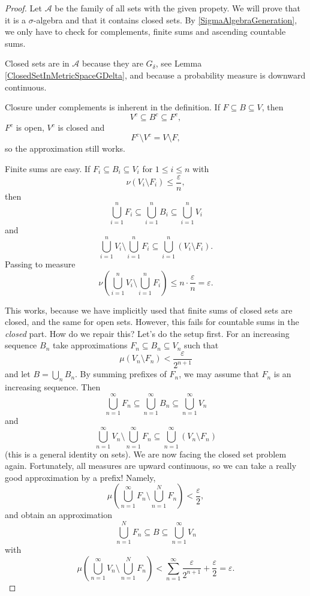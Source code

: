 \begin{proof}
    Let \( \mathcal{A} \) be the family of all sets with the given propety. We will prove that it is a \( \sigma \)-algebra and that it contains closed sets. By \ref{SigmaAlgebraGeneration}, we only have to check for complements, finite sums and ascending countable sums.

    Closed sets are in \( \mathcal{A} \) because they are \( G_\delta \), see Lemma \ref{ClosedSetInMetricSpaceGDelta}, and because a probability measure is downward continuous.

    Closure under complements is inherent in the definition. If \( F \subseteq B \subseteq V \), then 
    \[ 
      V^c \subseteq B^c \subseteq F^c,
   \]
   \( F^c \) is open, \( V^c \) is closed and
   \[ 
      F^c \setminus V^c = V \setminus F, 
  \]
  so the approximation still works.

Finite sums are easy. If \( F_i \subseteq B_i \subseteq V_i \) for \( 1 \leqslant i \leqslant n \) with
\[ 
    \nu \left( V_i \setminus F_i \right) \leqslant \frac{\varepsilon }{n}, 
\]
then
\[ 
\bigcup_{i=1}^n F_i \subseteq \bigcup_{i=1}^n B_i \subseteq \bigcup_{i=1}^n V_i
\]
and 
\[ 
    \bigcup_{i=1}^n V_i \setminus \bigcup_{i=1}^n F_i \subseteq \bigcup_{i=1}^n (V_i \setminus F_i).
\]
Passing to measure
\[ 
    \nu \left( \bigcup_{i=1}^n V_i \setminus \bigcup_{i=1}^n F_i \right) \leqslant n \cdot \frac{\varepsilon }{n} =\varepsilon. 
\]

This works, because we have implicitly used that finite sums of closed sets are closed, and the same for open sets. However, this fails for countable sums in the \emph{closed} part. How do we repair this? Let's do the setup first. For an increasing sequence \( B_n \) take approximations \( F_n \subseteq B_n \subseteq V_n \) such that
\[ 
    \mu \left( V_n \setminus F_n \right) < \frac{\varepsilon }{2^{n+1}}
\]
and let \( B = \bigcup_n B_n \). By summing prefixes of \( F_n \), we may assume that \( F_n \) is an increasing sequence. Then
\[ 
    \bigcup_{n=1}^\infty F_n \subseteq \bigcup_{n=1}^\infty B_n \subseteq \bigcup_{n=1}^\infty V_n
\]
and
\[ 
    \bigcup_{n=1}^\infty V_n \setminus \bigcup_{n=1}^\infty F_n \subseteq \bigcup_{n=1}^\infty (V_n \setminus F_n) 
\]
(this is a general identity on sets). We are now facing the closed set problem again. Fortunately, all measures are upward continuous, so we can take a really good approximation by a prefix! Namely,
\[ 
    \mu \left( \bigcup_{n=1}^\infty F_n \setminus \bigcup_{n=1}^N F_n \right) < \frac{\varepsilon }{2},
\]
and obtain an approximation
\[ 
    \bigcup_{n=1}^N F_n \subseteq B \subseteq \bigcup_{n=1}^\infty V_n 
\]
with
\[ 
    \mu \left( \bigcup_{n=1}^\infty V_n \setminus \bigcup_{n=1}^N F_n \right) < \sum_{n=1}^\infty \frac{\varepsilon }{2^{n+1}} + \frac{\varepsilon }{2} =\varepsilon.
\]
\end{proof}

